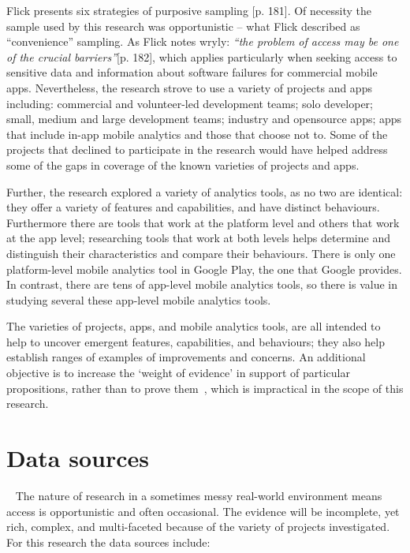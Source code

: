 Flick presents six strategies of purposive sampling [p. 181]. Of necessity the sample used by this research was opportunistic -- what Flick described as ``convenience'' sampling. As Flick notes wryly: \emph{``the problem of access may be one of the crucial barriers''}[p. 182], which applies particularly when seeking access to sensitive data and information about software failures for commercial mobile apps. Nevertheless, the research strove to use a variety of projects and apps including: commercial and volunteer-led development teams; solo developer; small, medium and large development teams; industry and opensource apps; apps that include in-app mobile analytics and those that choose not to. Some of the projects that declined to participate in the research would have helped address some of the gaps in coverage of the known varieties of projects and apps.

Further, the research explored a variety of analytics tools, as no two are identical: they offer a variety of features and capabilities, and have distinct behaviours.  Furthermore there are tools that work at the platform level and others that work at the app level; researching tools that work at both levels helps determine and distinguish their characteristics and compare their behaviours. There is only one platform-level mobile analytics tool in Google Play, the one that Google provides. In contrast, there are tens of app-level mobile analytics tools, so there is value in studying several these app-level mobile analytics tools.

The varieties of projects, apps, and mobile analytics tools, are all intended to help to uncover emergent features, capabilities, and behaviours; they also help establish ranges of examples of improvements and concerns. An additional objective is to increase the `weight of evidence' in support of particular propositions, rather than to prove them~, which is impractical in the scope of this research.


\section{Data sources}~\label{methodology-data-sources}
The nature of research in a sometimes messy real-world environment means access is opportunistic and often occasional. The evidence will be incomplete, yet rich, complex, and multi-faceted because of the variety of projects investigated. For this research the data sources include:

